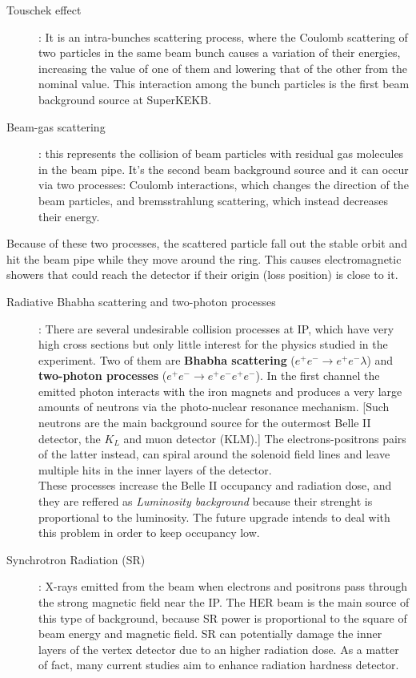 \begin{description}
\item[Touschek effect]: 
	It is an intra-bunches scattering process, where the Coulomb scattering of two particles in the same beam bunch causes a variation of their energies, increasing the value of one of them and lowering that of the other from the nominal value. This interaction among the bunch particles is the first beam background source at SuperKEKB.
\item[Beam-gas scattering]: 
	this represents the collision of beam particles with residual gas molecules in the beam pipe. It's the second beam background source and it can occur via two processes: Coulomb interactions, which changes the direction of the beam particles, and bremsstrahlung scattering, which instead decreases their energy. 
\end{description}
	
Because of these two processes, the scattered particle fall out the stable orbit and hit the beam pipe while they move around the ring. This causes electromagnetic showers that could reach the detector if their origin (loss position) is close to it.


\begin{description}
\item[Radiative Bhabha scattering and two-photon processes]:
	There are several undesirable collision processes at IP, which have very high cross sections but only little interest for the physics studied in the experiment. Two of them are \textbf{Bhabha scattering} ($e^{+}e^{-} \rightarrow e^{+}e^{-} \lambda$) and \textbf{two-photon processes} ($e^{+}e^{-} \rightarrow e^{+}e^{-}e^{+}e^{-} $). 
	In the first channel the emitted photon interacts with the iron magnets and produces a very large amounts of neutrons via the photo-nuclear resonance mechanism. [Such neutrons are the main background source for the outermost Belle II detector, the $K_{L}$ and muon detector (KLM).] The electrons-positrons pairs of the latter instead, can spiral around the solenoid field lines and leave multiple hits in the inner layers of the detector.\\
	
These processes increase the Belle II occupancy and radiation dose, and they are reffered as \textit{Luminosity background} because their strenght is proportional to the luminosity. The future upgrade intends to deal with this problem in order to keep occupancy low.

\item[Synchrotron Radiation (SR)]:
	X-rays emitted from the beam when electrons and positrons pass through the strong magnetic field near the IP. The HER beam is the main source of this type of background, because SR power is proportional to the square of beam energy and magnetic field.
SR can potentially damage the inner layers of the vertex detector due to an higher radiation dose. As a matter of fact, many current studies aim to enhance radiation hardness detector.
\end{description}

